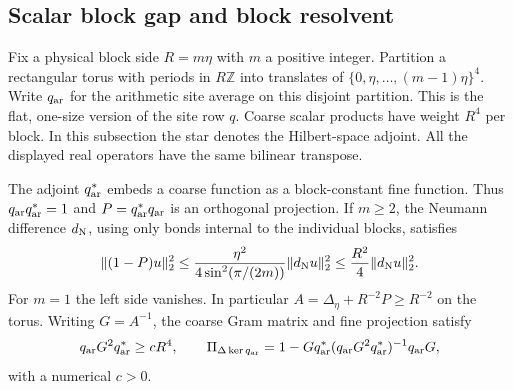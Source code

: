 \documentclass[11pt,letterpaper,reqno]{amsart}
\makeatletter
\numberwithin{equation}{section}
\theoremstyle{definition}
\newcommand{\ms@minorstart}{%
  \pushQED{\qed}\renewcommand{\qedsymbol}{$\blacksquare$}}
\newenvironment{proposition}[1][]{\ms@minorstart\ms@proposition[#1]}
  {\popQED\endms@proposition}
\theoremstyle{remark}
\makeatother
\begin{document}
\subsection{Scalar block gap and block resolvent}
\label{mb:sec-scalar-block}

Fix a physical block side \(R=m\eta\) with \(m\) a positive
integer. Partition a rectangular torus with periods in \(R\mathbb Z\)
into translates of \(\{0,\eta,\ldots,(m-1)\eta\}^4\).
Write \(q_{\rm ar}\) for the arithmetic site average on this disjoint
partition. This is the flat, one-size version of the site row
\(q\). Coarse scalar products have weight \(R^4\) per block.
In this subsection the star denotes the Hilbert-space adjoint.
All the displayed real operators have the same bilinear transpose.

\begin{proposition}[Mean, gap, and projection]\label{mb:prop-scalar-block-gap}
The adjoint \(q_{\rm ar}^*\) embeds a coarse function as a block-constant
fine function. Thus \(q_{\rm ar}q_{\rm ar}^*=1\) and \(P=q_{\rm ar}^*q_{\rm ar}\) is an
orthogonal projection. If \(m\ge2\), the Neumann difference
\(d_{\rm N}\), using only bonds internal to the individual blocks,
satisfies
\begin{equation}\label{mb:eq-block-poincare}
 \|(1-P)u\|_2^2\le
 \frac{\eta^2}{4\sin^2(\pi/(2m))}\|d_{\rm N}u\|_2^2
                    \le \frac{R^2}{4}\|d_{\rm N}u\|_2^2 .
\end{equation}
For \(m=1\) the left side vanishes. In particular
\(A=\Delta_\eta+R^{-2}P\ge R^{-2}\) on the torus.
Writing \(G=A^{-1}\), the coarse Gram matrix and fine projection
satisfy
\begin{equation}\label{mb:eq-scalar-block-gram}
 q_{\rm ar}G^2q_{\rm ar}^*\ge cR^4,\qquad
 \Pi_{\Delta\ker q_{\rm ar}}
   =1-Gq_{\rm ar}^*(q_{\rm ar}G^2q_{\rm ar}^*)^{-1}q_{\rm ar}G ,
\end{equation}
with a numerical \(c>0\).
\end{proposition}
\end{document}
